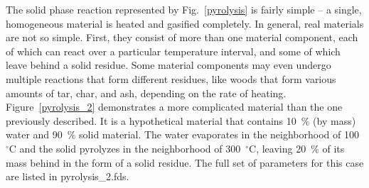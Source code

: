 \documentclass[11pt]{book}
\begin{document}
The solid phase reaction represented by Fig.~\ref{pyrolysis} is fairly simple -- a single, homogeneous material is
heated and gasified completely.
In general, real materials are not so simple. First, they consist of more than one material component, each of which can
react over a particular
temperature interval, and some of which leave behind a solid residue.
Some material components may even undergo multiple reactions that
form different residues, like woods that form various amounts of tar, char, and ash, depending on the rate of heating.
Figure~\ref{pyrolysis_2} demonstrates a more complicated material than the one previously described.
It is a hypothetical material that
contains 10~\% (by mass) water and 90~\% solid material. The water evaporates in the neighborhood of 100~$^\circ$C and the
solid pyrolyzes in the
neighborhood of 300~$^\circ$C, leaving 20~\% of its mass behind in the form of a solid residue. The full set of parameters for this case are listed in {\ct pyrolysis\_2.fds}.
\end{document}
